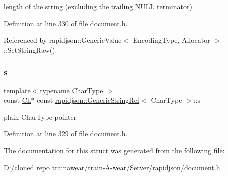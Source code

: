length of the string (excluding the trailing N\+U\+LL terminator) 



Definition at line 330 of file document.\+h.



Referenced by rapidjson\+::\+Generic\+Value$<$ Encoding\+Type, Allocator $>$\+::\+Set\+String\+Raw().

\mbox{\label{structrapidjson_1_1_generic_string_ref_a001276ee57cbcbd3c14449045c71e994}} 
\subsubsection{\texorpdfstring{s}{s}}
{\footnotesize\ttfamily template$<$typename Char\+Type $>$ \\
const \mbox{\hyperlink{structrapidjson_1_1_generic_string_ref_aa2a8eccae3d7eb14c30bc21afb7d6fba}{Ch}}$\ast$ const \mbox{\hyperlink{structrapidjson_1_1_generic_string_ref}{rapidjson\+::\+Generic\+String\+Ref}}$<$ Char\+Type $>$\+::s}



plain Char\+Type pointer 



Definition at line 329 of file document.\+h.



The documentation for this struct was generated from the following file\+:\begin{DoxyCompactItemize}
\item 
D\+:/cloned repo trainawear/train-\/\+A-\/wear/\+Server/rapidjson/\mbox{\hyperlink{document_8h}{document.\+h}}\end{DoxyCompactItemize}
